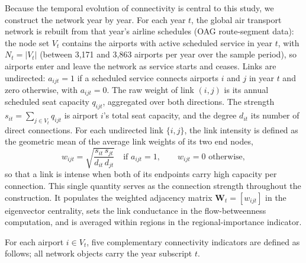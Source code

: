 Because the temporal evolution of connectivity is central to this study, we construct the network year by year. For each year $t$,  the global air transport network is rebuilt from that year's airline schedules (OAG route-segment data): the node set $V_t$ contains the airports with active scheduled service in year $t$, with $N_t=|V_t|$ (between 3{,}171 and 3{,}863 airports per year over the sample period), so airports enter and leave the network as service starts and ceases. Links are undirected: $a_{ijt}=1$ if a scheduled service connects airports $i$ and $j$ in year $t$ and zero otherwise, with $a_{ijt}=0$. The raw weight of link $(i,j)$ is its annual scheduled seat capacity $q_{ijt}$, aggregated over both directions. The strength $s_{it}=\sum_{j\in V_t} q_{ijt}$ is airport $i$'s total seat capacity, and the degree $d_{it}$ its number of direct connections. For each undirected link $\{i,j\}$, the link intensity is defined as the geometric mean of the average link weights of its two end nodes,
\begin{equation}
    w_{ijt}
    =
    \sqrt{\frac{s_{it}\,s_{jt}}{d_{it}\,d_{jt}}}
    \quad\text{if } a_{ijt}=1,
    \qquad w_{ijt}=0 \text{ otherwise},
    \label{eq:gaci_link_intensity}
\end{equation}
so that a link is intense when both of its endpoints carry high capacity per connection. This single quantity serves as the connection strength throughout the construction. It populates the weighted adjacency matrix $\mathbf{W}_t=[w_{ijt}]$ in the eigenvector centrality, sets the link conductance in the flow-betweenness computation, and is averaged within regions in the regional-importance indicator.

For each airport $i \in V_t$, five complementary connectivity indicators are defined as follows; all network objects carry the year subscript $t$.

